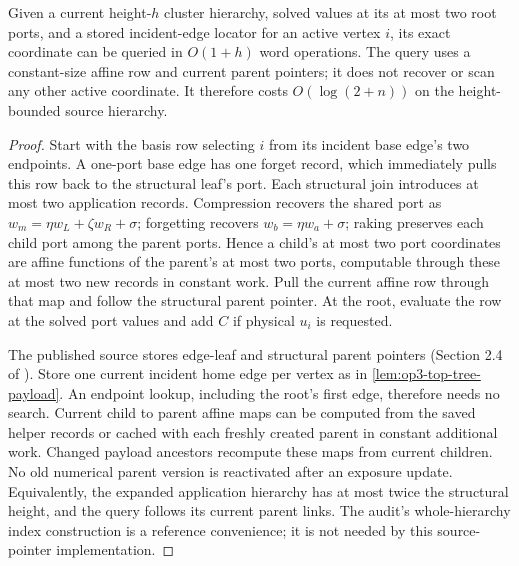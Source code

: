 \begin{lemma}
\label{lem:op3-cluster-point-query}
Given a current height-$h$ cluster hierarchy, solved values at its at most
two root ports, and a stored incident-edge locator for an active vertex
$i$, its exact coordinate can be queried in $O(1+h)$ word operations.
The query uses a constant-size affine row and current parent pointers; it
does not recover or scan any other active coordinate. It therefore costs
$O(\log(2+n))$ on the height-bounded source hierarchy.
\end{lemma}
\begin{proof}
Start with the basis row selecting $i$ from its incident base edge's two
endpoints. A one-port base edge has one forget record, which immediately
pulls this row back to the structural leaf's port. Each structural join
introduces at most two application records. Compression recovers the shared
port as $w_m=\eta w_L+\zeta w_R+\sigma$; forgetting recovers
$w_b=\eta w_a+\sigma$; raking preserves each child port among the parent
ports. Hence a child's at most two port coordinates are affine functions
of the parent's at most two ports, computable through these at most two
new records in constant work. Pull the current affine row through that map
and follow the structural parent pointer. At the root, evaluate the row at
the solved port values and add $C$ if physical $u_i$ is requested.

The published source stores edge-leaf and structural parent pointers
(Section 2.4 of \cite{alstrup2005toptrees}). Store one current incident home
edge per vertex as in \cref{lem:op3-top-tree-payload}. An endpoint lookup,
including the root's first edge, therefore needs no search. Current child
to parent affine maps can be computed from the saved helper records or
cached with each freshly created parent in constant additional work.
Changed payload ancestors recompute these maps from current children.
No old numerical parent version is reactivated after an exposure update.
Equivalently, the expanded application hierarchy has at most twice the
structural height, and the query follows its current parent links.
The audit's whole-hierarchy index construction is a reference convenience;
it is not needed by this source-pointer implementation.
\end{proof}

